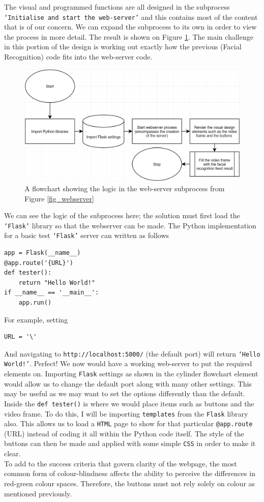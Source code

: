 \documentclass[9pt]{article}
\begin{document}
The visual and programmed functions are all designed in the subprocess \texttt{`Initialise and start the web-server'} and this contains most of the content that is of our concern. We can expand the subprocess to its own in order to view the process in more detail. The result is shown on Figure \ref{fig_webserverExpand1}. The main challenge in this portion of the design is working out exactly how the previous (Facial Recognition) code fits into the web-server code.
\begin{figure}[H]
	\centering
	\includegraphics[width=5in]{webserverExtended.png}
	\caption{A flowchart showing the logic in the web-server subprocess from Figure \ref{fig_webserver}}\label{fig_webserverExpand1}
\end{figure}
We can see the logic of the subprocess here; the solution must first load the \texttt{`Flask'} library so that the webserver can be made. The Python implementation for a basic test \texttt{`Flask'} server can written as follows
\begin{lstlisting}
app = Flask(__name__)
@app.route('{URL}')
def tester():
	return "Hello World!"
if __name__ == '__main__':
	app.run()
\end{lstlisting}
For example, setting
\begin{lstlisting}
URL = '\'
\end{lstlisting}
And navigating to \texttt{http://localhost:5000/} (the default port) will return \texttt{`Hello World!'}. Perfect! We now would have a working web-server to put the required elements on. Importing \texttt{Flask} settings as shown in the cylinder flowchart element would allow us to change the default port along with many other settings. This may be useful as we may want to set the options differently than the default. Inside the \texttt{def tester()} is where we would place items such as buttons and the video frame. To do this, I will be importing \texttt{templates} from the \texttt{Flask} library also. This allows us to load a \texttt{HTML} page to show for that particular \texttt{@app.route} (URL) instead of coding it all within the Python code itself. The style of the buttons can then be made and applied with some simple \texttt{CSS} in order to make it clear. \\To add to the success criteria that govern clarity of the webpage, the most common form of colour-blindness affects the ability to perceive the differences in red-green colour spaces\cite{colourBlindness}. Therefore, the buttons must not rely solely on colour as mentioned previously.\\\\
\end{document}
